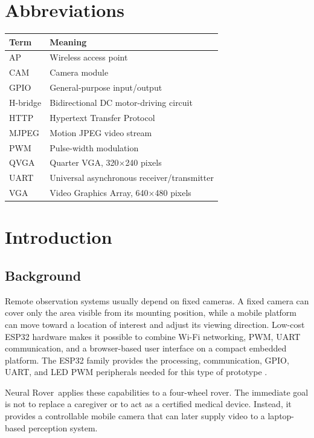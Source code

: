 \documentclass[12pt,a4paper,oneside]{report}
\newcommand{\ProjectTitle}{Neural Rover}
\begin{document}
\chapter*{Abbreviations}
\begin{tabularx}{\textwidth}{lY}
  \toprule
  \textbf{Term} & \textbf{Meaning} \\
  \midrule
  AP & Wireless access point \\
  CAM & Camera module \\
  GPIO & General-purpose input/output \\
  H-bridge & Bidirectional DC motor-driving circuit \\
  HTTP & Hypertext Transfer Protocol \\
  MJPEG & Motion JPEG video stream \\
  PWM & Pulse-width modulation \\
  QVGA & Quarter VGA, 320$\times$240 pixels \\
  UART & Universal asynchronous receiver/transmitter \\
  VGA & Video Graphics Array, 640$\times$480 pixels \\
  \bottomrule
\end{tabularx}

\clearpage
{}

\chapter{Introduction}
\label{ch:introduction}

\section{Background}
Remote observation systems usually depend on fixed cameras. A fixed camera can
cover only the area visible from its mounting position, while a mobile platform
can move toward a location of interest and adjust its viewing direction.
Low-cost ESP32 hardware makes it possible to combine Wi-Fi networking, PWM,
UART communication, and a browser-based user interface on a compact embedded
platform. The ESP32 family provides the processing, communication, GPIO, UART,
and LED PWM peripherals needed for this type of prototype
\cite{esp32datasheet}.

\ProjectTitle\ applies these capabilities to a four-wheel rover. The immediate
goal is not to replace a caregiver or to act as a certified medical device.
Instead, it provides a controllable mobile camera that can later supply video to
a laptop-based perception system.
\end{document}
